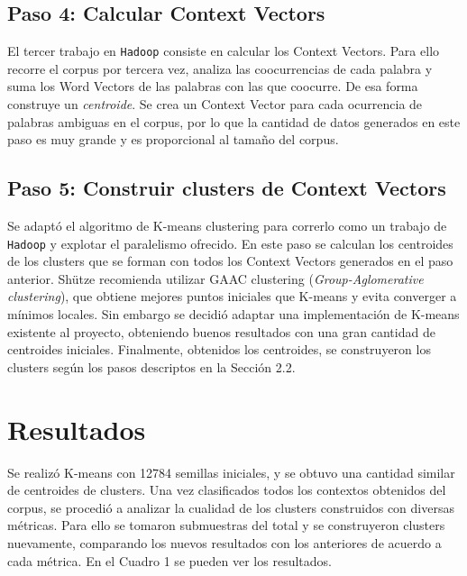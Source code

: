 \documentclass[11pt]{article}
\begin{document}
\subsection{Paso 4: Calcular Context Vectors}
El tercer trabajo en \texttt{Hadoop} consiste en calcular los Context Vectors. Para ello recorre el corpus por tercera vez, analiza las coocurrencias de cada palabra y suma los Word Vectors de las palabras con las que coocurre. De esa forma construye un \emph{centroide}.
Se crea un Context Vector para cada ocurrencia de palabras ambiguas en el corpus, por lo que la cantidad de datos generados en este paso es muy grande y es proporcional al tamaño del corpus. 
\subsection{Paso 5: Construir clusters de Context Vectors}
Se adaptó el algoritmo de K-means clustering para correrlo como un trabajo de \texttt{Hadoop} y explotar el paralelismo ofrecido.
En este paso se calculan los centroides de los clusters que se forman con todos los Context Vectors generados en el paso anterior.
Shütze recomienda utilizar GAAC clustering (\emph{Group-Aglomerative clustering}), que obtiene mejores puntos iniciales que K-means y evita converger a mínimos locales.
Sin embargo se decidió adaptar una implementación de K-means existente al proyecto, obteniendo buenos resultados con una gran cantidad de centroides iniciales.
Finalmente, obtenidos los centroides, se construyeron los clusters según los pasos descriptos en la Sección 2.2.

\section{Resultados}
Se realizó K-means con 12784 semillas iniciales, y se obtuvo una cantidad similar de centroides de clusters.
Una vez clasificados todos los contextos obtenidos del corpus, se procedió a analizar la cualidad de los clusters construidos con diversas métricas. Para ello se tomaron submuestras del total y se construyeron clusters nuevamente, comparando los nuevos resultados con los anteriores de acuerdo a cada métrica.
En el Cuadro 1 se pueden ver los resultados.
\end{document}
